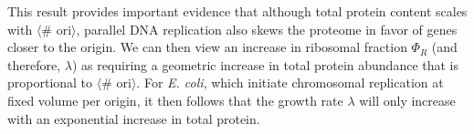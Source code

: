 
%
%
%
%
%

This result provides important evidence that although total protein content
scales with $\langle$\# ori$\rangle$, parallel DNA replication also skews the proteome in favor of
genes closer to the origin.  We can then view an increase in ribosomal fraction $\Phi_R$ (and
therefore, $\lambda$) as requiring a geometric increase in total protein abundance that
is proportional to $\langle$\# ori$\rangle$. For \textit{E. coli}, which
initiate chromosomal replication at fixed volume per origin, it then follows
that the growth rate $\lambda$ will only increase with an exponential increase
in total protein.

